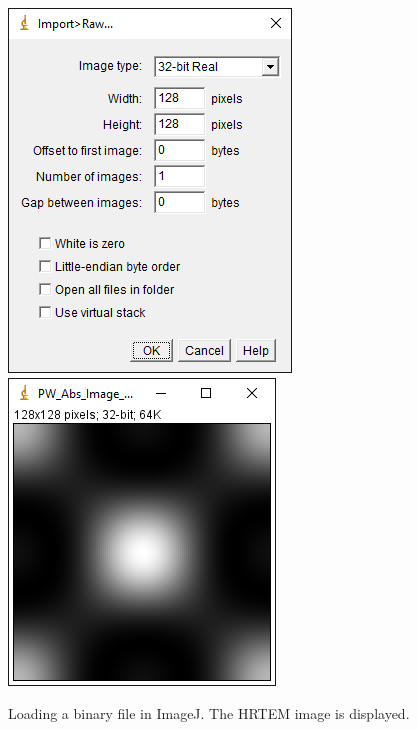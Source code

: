 \documentclass[12pt,a4paper]{article}
\begin{document}
\begin{figure}[!h]
\begin{center}
    \includegraphics[scale=0.75]{figures/ImageJ_ImportRaw.png}
    \includegraphics[scale=0.75]{figures/pw_abs_image.png}
\caption{Loading a binary file in ImageJ. The HRTEM image is displayed.}
\label{fig:ImageJ_ImportRaw}
\end{center}
\end{figure}
\end{document}
